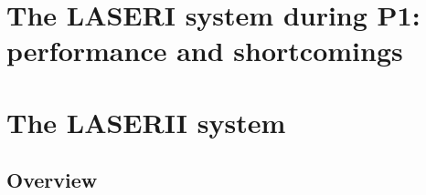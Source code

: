 \documentclass[UKenglish,texlive=2013]{\ATLASLATEXPATH atlasdoc}
\begin{document}
\section{The LASERI system during P1: performance and shortcomings}
\label{sec:detector}



\section{The LASERII system}
\label{sec:result}

\subsection{Overview}
\end{document}

